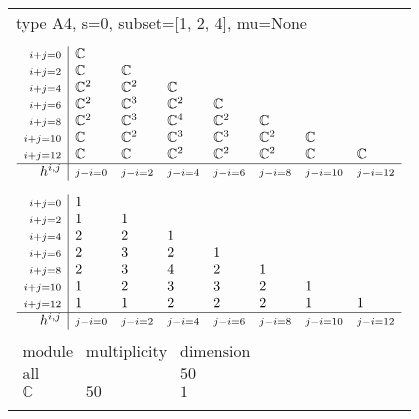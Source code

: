 \documentclass[crop,border=2mm]{standalone}
\begin{document}
\begin{tabular}{l}
{\huge type A4, s=0, subset=[1, 2, 4], mu=None}\\ \\


$\displaystyle
\begin{array}{r|l l l l l l l}
	{\scriptstyle i+j=0}&\mathbb{C}&&&&&&\\
	{\scriptstyle i+j=2}&\mathbb{C}&\mathbb{C}&&&&&\\
	{\scriptstyle i+j=4}&\mathbb{C}^{2}&\mathbb{C}^{2}&\mathbb{C}&&&&\\
	{\scriptstyle i+j=6}&\mathbb{C}^{2}&\mathbb{C}^{3}&\mathbb{C}^{2}&\mathbb{C}&&&\\
	{\scriptstyle i+j=8}&\mathbb{C}^{2}&\mathbb{C}^{3}&\mathbb{C}^{4}&\mathbb{C}^{2}&\mathbb{C}&&\\
	{\scriptstyle i+j=10}&\mathbb{C}&\mathbb{C}^{2}&\mathbb{C}^{3}&\mathbb{C}^{3}&\mathbb{C}^{2}&\mathbb{C}&\\
	{\scriptstyle i+j=12}&\mathbb{C}&\mathbb{C}&\mathbb{C}^{2}&\mathbb{C}^{2}&\mathbb{C}^{2}&\mathbb{C}&\mathbb{C}\\
	\hline h^{i,j}&{\scriptstyle j-i=0}&{\scriptstyle j-i=2}&{\scriptstyle j-i=4}&{\scriptstyle j-i=6}&{\scriptstyle j-i=8}&{\scriptstyle j-i=10}&{\scriptstyle j-i=12}
\end{array}
$ \\ \\


$\displaystyle
\begin{array}{r|l l l l l l l}
	{\scriptstyle i+j=0}&1&&&&&&\\
	{\scriptstyle i+j=2}&1&1&&&&&\\
	{\scriptstyle i+j=4}&2&2&1&&&&\\
	{\scriptstyle i+j=6}&2&3&2&1&&&\\
	{\scriptstyle i+j=8}&2&3&4&2&1&&\\
	{\scriptstyle i+j=10}&1&2&3&3&2&1&\\
	{\scriptstyle i+j=12}&1&1&2&2&2&1&1\\
	\hline h^{i,j}&{\scriptstyle j-i=0}&{\scriptstyle j-i=2}&{\scriptstyle j-i=4}&{\scriptstyle j-i=6}&{\scriptstyle j-i=8}&{\scriptstyle j-i=10}&{\scriptstyle j-i=12}
\end{array}
$ \\ \\


$\displaystyle
\begin{array}{rll}
	\text{module}&\text{multiplicity}&\text{dimension} \\ \hline \text{all}&&50 \\
	\mathbb{C}&50&1
\end{array}
$ \\ \\

\end{tabular}
\end{document}
